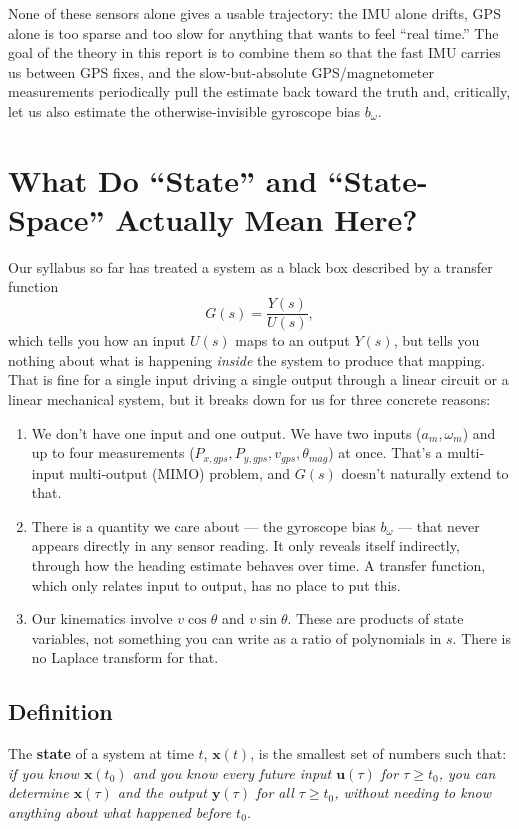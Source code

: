 \documentclass[11pt,a4paper]{article}
\begin{document}
None of these sensors alone gives a usable trajectory: the IMU alone drifts, GPS alone is too sparse and too slow for anything that wants to feel ``real time.'' The goal of the theory in this report is to combine them so that the fast IMU carries us between GPS fixes, and the slow-but-absolute GPS/magnetometer measurements periodically pull the estimate back toward the truth and, critically, let us also estimate the otherwise-invisible gyroscope bias $b_\omega$.

\section{What Do ``State'' and ``State-Space'' Actually Mean Here?}

Our syllabus so far has treated a system as a black box described by a transfer function
\begin{equation}
    G(s) = \frac{Y(s)}{U(s)},
\end{equation}
which tells you how an input $U(s)$ maps to an output $Y(s)$, but tells you nothing about what is happening \emph{inside} the system to produce that mapping. That is fine for a single input driving a single output through a linear circuit or a linear mechanical system, but it breaks down for us for three concrete reasons:

\begin{enumerate}
    \item We don't have one input and one output. We have two inputs ($a_m, \omega_m$) and up to four measurements ($P_{x,gps}, P_{y,gps}, v_{gps}, \theta_{mag}$) at once. That's a multi-input multi-output (MIMO) problem, and $G(s)$ doesn't naturally extend to that.
    \item There is a quantity we care about --- the gyroscope bias $b_\omega$ --- that never appears directly in any sensor reading. It only reveals itself indirectly, through how the heading estimate behaves over time. A transfer function, which only relates input to output, has no place to put this.
    \item Our kinematics involve $v\cos\theta$ and $v\sin\theta$. These are products of state variables, not something you can write as a ratio of polynomials in $s$. There is no Laplace transform for that.
\end{enumerate}

\subsection*{Definition}
The \textbf{state} of a system at time $t$, $\mathbf{x}(t)$, is the smallest set of numbers such that: \emph{if you know $\mathbf{x}(t_0)$ and you know every future input $\mathbf{u}(\tau)$ for $\tau \geq t_0$, you can determine $\mathbf{x}(\tau)$ and the output $\mathbf{y}(\tau)$ for all $\tau \geq t_0$, without needing to know anything about what happened before $t_0$.}
\end{document}
